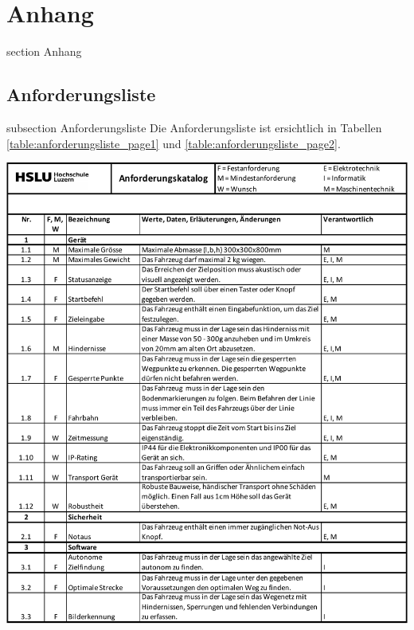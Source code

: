\newpage

\section*{Anhang}
    {section}
    {Anhang}
    
\subsection*{Anforderungsliste}\label{anforderungliste}
    {subsection}
    {Anforderungsliste}
Die  Anforderungsliste ist ersichtlich in Tabellen \ref{table:anforderungsliste_page1} und \ref{table:anforderungsliste_page2}.

\begin{table}[H]
\centering
\includegraphics[width=\textwidth]{assets/Anforderungsliste_V1.01_page1.pdf}
\caption{Anforderungsliste Teil 1}
\label{table:anforderungsliste_page1}
\end{table}
\newpage

